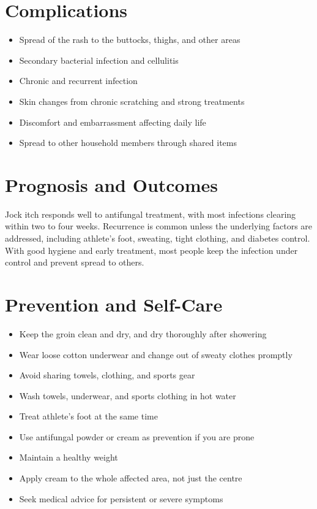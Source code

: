 \section*{Complications}
\begin{itemize}
    \item Spread of the rash to the buttocks, thighs, and other areas
    \item Secondary bacterial infection and cellulitis
    \item Chronic and recurrent infection
    \item Skin changes from chronic scratching and strong treatments
    \item Discomfort and embarrassment affecting daily life
    \item Spread to other household members through shared items
\end{itemize}

\section*{Prognosis and Outcomes}
Jock itch responds well to antifungal treatment, with most infections clearing within two to four weeks. Recurrence is common unless the underlying factors are addressed, including athlete's foot, sweating, tight clothing, and diabetes control. With good hygiene and early treatment, most people keep the infection under control and prevent spread to others.

\section*{Prevention and Self-Care}
\begin{itemize}
    \item Keep the groin clean and dry, and dry thoroughly after showering
    \item Wear loose cotton underwear and change out of sweaty clothes promptly
    \item Avoid sharing towels, clothing, and sports gear
    \item Wash towels, underwear, and sports clothing in hot water
    \item Treat athlete's foot at the same time
    \item Use antifungal powder or cream as prevention if you are prone
    \item Maintain a healthy weight
    \item Apply cream to the whole affected area, not just the centre
    \item Seek medical advice for persistent or severe symptoms
\end{itemize}


